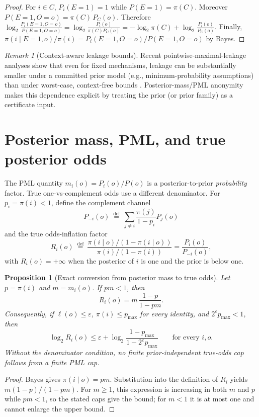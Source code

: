 \documentclass[11pt]{article}
\newcommand{\defeq}{\stackrel{\mathrm{def}}{=}}
\newtheorem{proposition}{Proposition}
\theoremstyle{definition}
\theoremstyle{remark}
\newtheorem{remark}{Remark}
\begin{document}
\begin{proof}
For $i\in C$, $P_i(E{=}1)=1$ while $P(E{=}1)=\pi(C)$.
Moreover $P(E{=}1,O=o)=\pi(C)\,P_C(o)$.
Therefore
$\log_2\tfrac{P_i(E{=}1,O=o)}{P(E{=}1,O=o)}=\log_2\tfrac{P_i(o)}{\pi(C)P_C(o)}=-\log_2\pi(C)+\log_2\tfrac{P_i(o)}{P_C(o)}$.
Finally, $\pi(i\mid E{=}1,o)/\pi(i)=P_i(E{=}1,O=o)/P(E{=}1,O=o)$ by Bayes.
\end{proof}

\begin{remark}[Context-aware leakage bounds]
Recent pointwise-maximal-leakage analyses show that even for fixed mechanisms, leakage can be substantially smaller under a committed prior model (e.g., minimum-probability assumptions) than under worst-case, context-free bounds \cite{ZhaoSaeidianOechtering2026ContextAware}.
Posterior-mass/PML anonymity makes this dependence explicit by treating the prior (or prior family) as a certificate input.
\end{remark}

\section{Posterior mass, PML, and true posterior odds}\label{sec:true-odds}
The PML quantity $m_i(o)=P_i(o)/P(o)$ is a posterior-to-prior \emph{probability} factor.
True one-vs-complement odds use a different denominator.
For $p_i=\pi(i)<1$, define the complement channel
\[
P_{-i}(o)\ \defeq\ \sum_{j\ne i}\frac{\pi(j)}{1-p_i}P_j(o)
\]
and the true odds-inflation factor
\[
R_i(o)\ \defeq\
\frac{\pi(i\mid o)/(1-\pi(i\mid o))}{\pi(i)/(1-\pi(i))}
=\frac{P_i(o)}{P_{-i}(o)},
\]
with $R_i(o)=+\infty$ when the posterior of $i$ is one and the prior is below one.

\begin{proposition}[Exact conversion from posterior mass to true odds]\label{prop:mass-to-odds}
Let $p=\pi(i)$ and $m=m_i(o)$.
If $pm<1$, then
\[
R_i(o)=m\,\frac{1-p}{1-pm}.
\]
Consequently, if $\ell(o)\le\varepsilon$, $\pi(i)\le p_{\max}$ for every identity, and $2^\varepsilon p_{\max}<1$, then
\[
\log_2 R_i(o)
\le
\varepsilon+\log_2\frac{1-p_{\max}}{1-2^\varepsilon p_{\max}}
\qquad\text{for every }i,o.
\]
Without the denominator condition, no finite prior-independent true-odds cap follows from a finite PML cap.
\end{proposition}

\begin{proof}
Bayes gives $\pi(i\mid o)=pm$.
Substitution into the definition of $R_i$ yields $m(1-p)/(1-pm)$.
For $m\ge1$, this expression is increasing in both $m$ and $p$ while $pm<1$, so the stated caps give the bound; for $m<1$ it is at most one and cannot enlarge the upper bound.
\end{proof}
\end{document}
